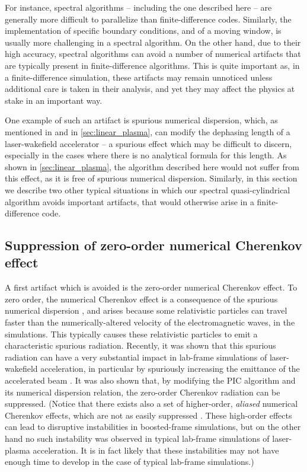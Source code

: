 \documentclass[1p,times]{elsarticle}
\begin{document}
For instance, spectral algorithms -- including the one described here
-- are generally more difficult to parallelize than finite-difference
codes. Similarly, the implementation of specific boundary
conditions, and of a moving window, is usually more challenging in a
spectral algorithm. On the other hand, due to their high accuracy,
spectral algorithms can avoid a
number of numerical artifacts that are typically present in
finite-difference algorithms. This is quite important as, in a
finite-difference simulation, these artifacts may remain unnoticed
unless additional care is taken in their analysis, and yet they may
affect the physics at stake in an important way.

One example of such an artifact is spurious numerical dispersion, which, as
mentioned in \cite{CowanPRSTAB2013} and in \cref{sec:linear_plasma}, 
can modify the dephasing length of a laser-wakefield accelerator -- a
spurious effect which
may be difficult to discern, especially in the cases where there is no
analytical formula for this length. As shown in
\cref{sec:linear_plasma}, the algorithm described here would not suffer
from this effect, as it is free of spurious numerical dispersion. Similarly, in
this section we describe two other typical situations in which our spectral
quasi-cylindrical algorithm avoids important artifacts, that would otherwise
arise in a finite-difference code. 

\subsection{Suppression of zero-order numerical Cherenkov effect}

A first artifact which is avoided is the zero-order numerical
Cherenkov effect. To zero order, the numerical Cherenkov effect is a 
consequence of the spurious numerical dispersion \cite{GodfreyJCP1974}, and arises 
because some relativistic particles can
travel faster than the numerically-altered velocity of the
electromagnetic waves, in the simulations. This typically causes these
relativistic particles to emit a characteristic spurious
radiation. Recently, it was shown that this spurious radiation
can have a very substantial impact in
lab-frame simulations of laser-wakefield acceleration, 
in particular by spuriously increasing the
emittance of the accelerated beam \cite{LehePRSTAB2013}. It
was also shown that, by modifying the PIC algorithm and its
numerical dispersion relation, the zero-order Cherenkov radiation can be
suppressed. (Notice that there exists also a set of higher-order,
\emph{aliased} numerical Cherenkov effects, which are not as easily
suppressed \cite{GodfreyJCP2013,XuCPC2013,GodfreyJCP2014,
GodfreyIEEE2014,YuJCP2014,YuCPC2015,GodfreyCPC2015}. 
These high-order effects can lead to
disruptive instabilities in boosted-frame simulations, but on the
other hand no such instability was observed in typical lab-frame
simulations of laser-plasma acceleration. 
It is in fact likely that these instabilities may not have enough time to
develop in the case of typical lab-frame simulations.) 
\end{document}
